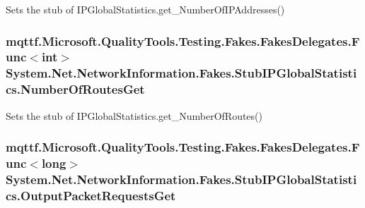 Sets the stub of I\-P\-Global\-Statistics.\-get\-\_\-\-Number\-Of\-I\-P\-Addresses()

\hypertarget{class_system_1_1_net_1_1_network_information_1_1_fakes_1_1_stub_i_p_global_statistics_a41f005333b80c5855b2ce71c2a368b90}{
\subsubsection[{Number\-Of\-Routes\-Get}]{\setlength{\rightskip}{0pt plus 5cm}mqttf.\-Microsoft.\-Quality\-Tools.\-Testing.\-Fakes.\-Fakes\-Delegates.\-Func$<$int$>$ System.\-Net.\-Network\-Information.\-Fakes.\-Stub\-I\-P\-Global\-Statistics.\-Number\-Of\-Routes\-Get}}\label{class_system_1_1_net_1_1_network_information_1_1_fakes_1_1_stub_i_p_global_statistics_a41f005333b80c5855b2ce71c2a368b90}


Sets the stub of I\-P\-Global\-Statistics.\-get\-\_\-\-Number\-Of\-Routes()

\hypertarget{class_system_1_1_net_1_1_network_information_1_1_fakes_1_1_stub_i_p_global_statistics_aa68c5a6d3c8467a233a9c842b595a165}{
\subsubsection[{Output\-Packet\-Requests\-Get}]{\setlength{\rightskip}{0pt plus 5cm}mqttf.\-Microsoft.\-Quality\-Tools.\-Testing.\-Fakes.\-Fakes\-Delegates.\-Func$<$long$>$ System.\-Net.\-Network\-Information.\-Fakes.\-Stub\-I\-P\-Global\-Statistics.\-Output\-Packet\-Requests\-Get}}\label{class_system_1_1_net_1_1_network_information_1_1_fakes_1_1_stub_i_p_global_statistics_aa68c5a6d3c8467a233a9c842b595a165}


